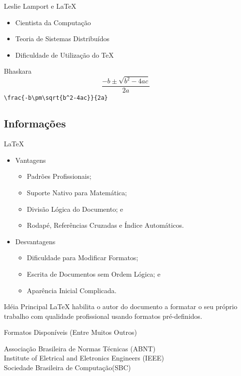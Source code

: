 \documentclass[hyperref={pdfpagelabels=false}]{beamer}
\begin{document}
\begin{frame}[fragile]{Leslie Lamport e \LaTeX{}}
    \begin{itemize}
        \item Cientista da Computação
        \item Teoria de Sistemas Distribuídos
        \item Dificuldade de Utilização do \TeX{}
    \end{itemize}
    \pause{}
    \begin{block}{Bhaskara}
        \begin{equation*}
            \frac{-b\pm\sqrt{b^2-4ac}}{2a}
        \end{equation*}
        \centering{}
        \verb,\frac{-b\pm\sqrt{b^2-4ac}}{2a},
    \end{block}
\end{frame}

\subsection{Informações}

\begin{frame}{\LaTeX{}}
    \begin{itemize}
        \item Vantagens\cite{oetiker2008}
        \begin{itemize}
            \item Padrões Profissionais;
            \item Suporte Nativo para Matemática;
            \item Divisão Lógica do Documento; e
            \item Rodapé, Referências Cruzadas e Índice Automáticos.
        \end{itemize}
        \item Desvantagens
        \begin{itemize}
            \item Dificuldade para Modificar Formatos;
            \item Escrita de Documentos sem Ordem Lógica; e
            \item Aparência Inicial Complicada.
        \end{itemize}
    \end{itemize}
\end{frame}

\begin{frame}{Idéia Principal}
    \LaTeX{}\cite{oetiker2008} habilita o autor do documento a formatar o seu
    próprio trabalho com qualidade profissional usando formatos
    \alert{pré-definidos}.
    \pause{}
    \begin{block}{Formatos Disponíveis (Entre Muitos Outros)}
        \begin{center}
            Associação Brasileira de Normas Técnicas (ABNT)\\
            Institute of Eletrical and Eletronics Engineers (IEEE)\\
            Sociedade Brasileira de Computação(SBC)
        \end{center}
    \end{block}
\end{frame}
\end{document}
